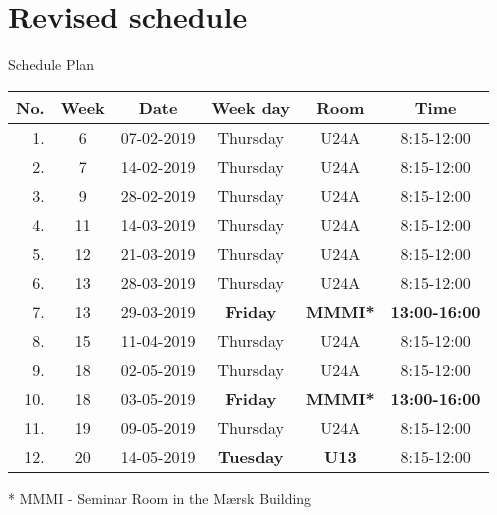 \section{Revised schedule}

\begin{frame}{Schedule Plan}
    \begin{center}
        {\small
        \begin{tabular}{r c c c c c}
            \hline
            No.	& Week & Date & Week day & Room & Time \\
            \hline
            1.    & 6  & 07-02-2019 & Thursday & U24A & 8:15-12:00 \\
            2.    & 7  & 14-02-2019 & Thursday & U24A & 8:15-12:00 \\
            3.    & 9  & 28-02-2019 & Thursday & U24A & 8:15-12:00 \\
            4.    & 11 & 14-03-2019 & Thursday & U24A & 8:15-12:00 \\
            5.    & 12 & 21-03-2019 & Thursday & U24A & 8:15-12:00 \\
            6.    & 13 & 28-03-2019 & Thursday & U24A & 8:15-12:00 \\
            7.   & 13 & 29-03-2019 & \textbf{Friday} & \textbf{MMMI*} & \textbf{13:00-16:00} \\
            8.    & 15 & 11-04-2019 & Thursday & U24A & 8:15-12:00 \\
            9.    & 18 & 02-05-2019 & Thursday & U24A & 8:15-12:00 \\
            10.   & 18 & 03-05-2019 & \textbf{Friday} & \textbf{MMMI*} & \textbf{13:00-16:00} \\
            11.    & 19 & 09-05-2019 & Thursday & U24A & 8:15-12:00 \\
            12.   & 20 & 14-05-2019 & \textbf{Tuesday} & \textbf{U13} & 8:15-12:00 \\
        \end{tabular}
    
    * MMMI - Seminar Room in the Mærsk Building
    }
    \end{center}
\end{frame}

